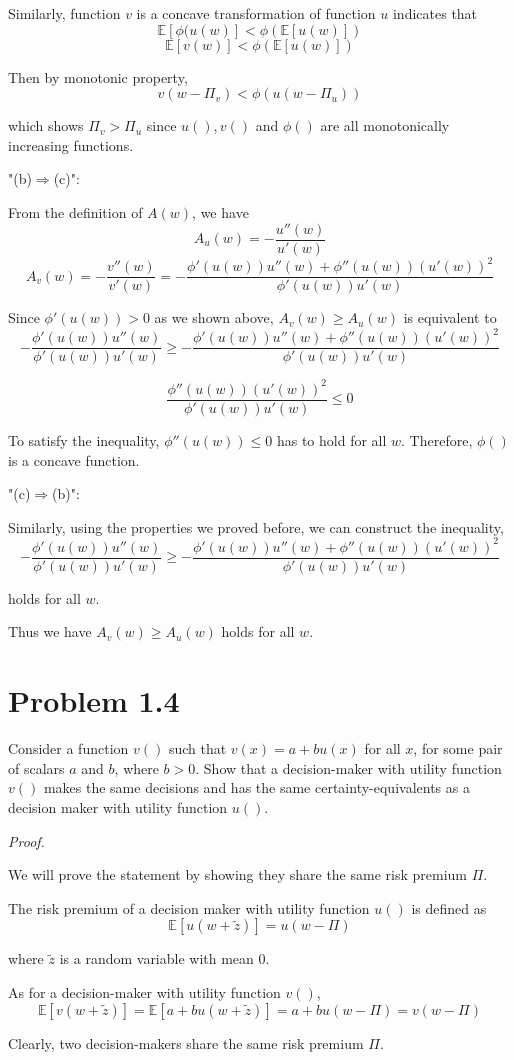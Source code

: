 \documentclass[a4paper]{article}
\begin{document}
Similarly, function $v$ is a concave transformation of function $u$ indicates that
\[\mathbb{E}[\phi(u(w)]<\phi(\mathbb{E}[u(w)])\]
\[\mathbb{E}[v(w)]<\phi(\mathbb{E}[u(w)])\]

Then by monotonic property, 
\[v(w-\Pi_v)<\phi(u(w-\Pi_u))\]

which shows $\Pi_v>\Pi_u$ since $u(), v()$ and $\phi()$ are all monotonically increasing functions.\newline

"(b)$\Rightarrow$(c)":\newline

From the definition of $A(w)$, we have
\[A_u(w)=-\frac{u''(w)}{u'(w)}\]
\[A_v(w)=-\frac{v''(w)}{v'(w)} = -\frac{\phi'(u(w))u''(w)+\phi''(u(w))(u'(w))^2}{\phi'(u(w))u'(w)}\]

Since $\phi'(u(w))>0$ as we shown above, $A_v(w) \geq A_u(w)$ is equivalent to
\[-\frac{\phi'(u(w))u''(w)}{\phi'(u(w))u'(w)} \geq -\frac{\phi'(u(w))u''(w)+\phi''(u(w))(u'(w))^2}{\phi'(u(w))u'(w)}\]

\[\frac{\phi''(u(w))(u'(w))^2}{\phi'(u(w))u'(w)} \leq 0\]

To satisfy the inequality, $\phi''(u(w)) \leq 0$ has to hold for all $w$. Therefore, $\phi()$ is a concave function.\newline

"(c)$\Rightarrow$(b)":\newline

Similarly, using the properties we proved before, we can construct the inequality,
\[-\frac{\phi'(u(w))u''(w)}{\phi'(u(w))u'(w)} \geq -\frac{\phi'(u(w))u''(w)+\phi''(u(w))(u'(w))^2}{\phi'(u(w))u'(w)}\]

holds for all $w$.\newline

Thus we have $A_v(w) \geq A_u(w)$ holds for all $w$.

\section{Problem 1.4}

Consider a function $v()$ such that $v(x)=a+bu(x)$ for all $x$, for some pair of scalars $a$ and $b$, where $b>0$. Show that a decision-maker with utility function $v()$ makes the same decisions and has the same certainty-equivalents as a decision maker with utility function $u()$.\newline

\textit{Proof.}\newline

We will prove the statement by showing they share the same risk premium $\Pi$.\newline

The risk premium of a decision maker with utility function $u()$ is defined as
\[\mathbb{E}[u(w+\tilde{z})]=u(w-\Pi)\]

where $\tilde{z}$ is a random variable with mean 0.\newline

As for a decision-maker with utility function $v()$,
\[\mathbb{E}[v(w+\tilde{z})]=\mathbb{E}[a+bu(w+\tilde{z})]=a+bu(w-\Pi)=v(w-\Pi)\]

Clearly, two decision-makers share the same risk premium $\Pi$.\newline
\end{document}
